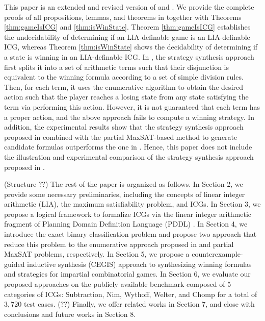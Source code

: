 \documentclass[review]{elsarticle}
\begin{document}
This paper is an extended and revised version of \cite{WuFXLQCR2020} and \cite{FanYD2024}.
We provide the complete proofs of all propositions, lemmas, and theorems in \cite{FanYD2024} together with Theorems \ref{thm:gameIsICG} and \ref{thm:isWinState}.
Theorem \ref{thm:gameIsICG} establishes the undecidability of determining if an LIA-definable game is an LIA-definable ICG, whereas Theorem \ref{thm:isWinState} shows the decidability of determining if a state is winning in an LIA-definable ICG.
In \cite{WuFXLQCR2020}, the strategy synthesis approach first splits it into a set of arithmetic terms such that their disjunction is equivalent to the winning formula according to a set of simple division rules.
Then, for each term, it uses the enumerative algorithm to obtain the desired action such that the player reaches a losing state from any state satisfying the term via performing this action.
However, it is not guaranteed that each term has a proper action, and the above approach fails to compute a winning strategy.
In addition, the experimental results show that the strategy synthesis approach proposed in \cite{FanYD2024} combined with the partial MaxSAT-based method to generate candidate formulas outperforms the one in \cite{WuFXLQCR2020}.
Hence, this paper does not include the illustration and experimental comparison of the strategy synthesis approach proposed in \cite{WuFXLQCR2020}.


	(Structure ??)
	The rest of the paper is organized as follows. 
	In Section 2, we provide some necessary preliminaries, including the concepts of linear integer arithmetic (LIA), the maximum satisfiability problem, and ICGs.
	In Section 3, we propose a logical framework to formalize ICGs via the linear integer arithmetic fragment of Planning Domain Definition Language (PDDL) \cite{FoxL2003}.
	In Section 4, we introduce the exact binary classification problem and propose two approach that reduce this problem to the enumerative approach proposed in \cite{UduRDMMA2013} and partial MaxSAT problems, respectively.
	In Section 5, we propose a counterexample-guided inductive synthesis (CEGIS) approach to synthesizing winning formulas and strategies for impartial combinatorial games.
	In Section 6, we evaluate our proposed approaches on the publicly available benchmark composed of 5 categories of ICGs: Subtraction, Nim, Wythoff, Welter, and Chomp for a total of $3,720$ test cases. (??) Finally, we offer related works in Section 7, and close with conclusions and future works in Section 8.
\end{document}
